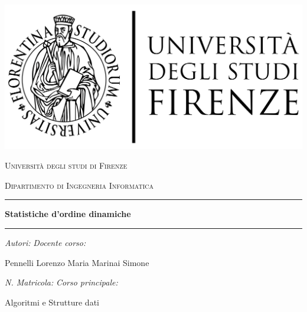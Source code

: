 \documentclass[10pt]{article}
\begin{document}
\par\medskip
\begin{center}
\includegraphics[scale=0.1,center]{unifilogo/firenze2}
\end{center}

\begin{center}
\par\medskip
\textsc{{\large Università degli studi di Firenze}}\\
\par\medskip
\textsc{{\normalsize Dipartimento di Ingegneria Informatica}}\\
\par\medskip
\par\medskip
\hrule width 12cm height 1pt \par
\par\medskip
\par\medskip
\par\medskip
{\Huge \textbf{Statistiche d'ordine dinamiche}}\\
\par\medskip
\par\medskip
\par\medskip
\hrule width 12cm height 1pt \par
\par\medskip
\par\medskip
\par\medskip
\par\medskip
\emph{Autori:} \hfill \emph{Docente corso:}\\
\par\medskip
Pennelli Lorenzo Maria \hfill Marinai Simone\\
\par\medskip
\par\medskip
\emph{N. Matricola:} \hfill \emph{Corso principale:}\\
\par{} \hfill Algoritmi e Strutture dati
\end{center}
\newpage
\end{document}
